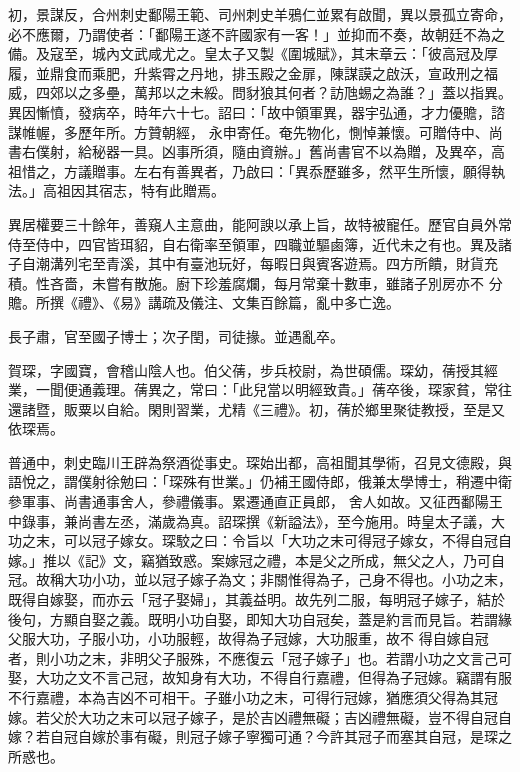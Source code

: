 \begin{pinyinscope}
 初，景謀反，合州刺史鄱陽王範、司州刺史羊鴉仁並累有啟聞，異以景孤立寄命，必不應爾，乃謂使者：「鄱陽王遂不許國家有一客！」並抑而不奏，故朝廷不為之備。及寇至，城內文武咸尤之。皇太子又製《圍城賦》，其末章云：「彼高冠及厚履，並鼎食而乘肥，升紫霄之丹地，排玉殿之金扉，陳謀謨之啟沃，宣政刑之福威，四郊以之多壘，萬邦以之未綏。問豺狼其何者？訪虺蜴之為誰？」蓋以指異。異因慚憤，發病卒，時年六十七。詔曰：「故中領軍異，器宇弘通，才力優贍，諮謀帷幄，多歷年所。方贊朝經，
 永申寄任。奄先物化，惻悼兼懷。可贈侍中、尚書右僕射，給秘器一具。凶事所須，隨由資辦。」舊尚書官不以為贈，及異卒，高祖惜之，方議贈事。左右有善異者，乃啟曰：「異忝歷雖多，然平生所懷，願得執法。」高祖因其宿志，特有此贈焉。



 異居權要三十餘年，善窺人主意曲，能阿諛以承上旨，故特被寵任。歷官自員外常侍至侍中，四官皆珥貂，自右衛率至領軍，四職並驅鹵簿，近代未之有也。異及諸子自潮溝列宅至青溪，其中有臺池玩好，每暇日與賓客遊焉。四方所饋，財貨充積。性吝嗇，未嘗有散施。廚下珍羞腐爛，每月常棄十數車，雖諸子別房亦不
 分贍。所撰《禮》、《易》講疏及儀注、文集百餘篇，亂中多亡逸。



 長子肅，官至國子博士；次子閏，司徒掾。並遇亂卒。



 賀琛，字國寶，會稽山陰人也。伯父蒨，步兵校尉，為世碩儒。琛幼，蒨授其經業，一聞便通義理。蒨異之，常曰：「此兒當以明經致貴。」蒨卒後，琛家貧，常往還諸暨，販粟以自給。閑則習業，尤精《三禮》。初，蒨於鄉里聚徒教授，至是又依琛焉。



 普通中，刺史臨川王辟為祭酒從事史。琛始出都，高祖聞其學術，召見文德殿，與語悅之，謂僕射徐勉曰：「琛殊有世業。」仍補王國侍郎，俄兼太學博士，稍遷中衛參軍事、尚書通事舍人，參禮儀事。累遷通直正員郎，
 舍人如故。又征西鄱陽王中錄事，兼尚書左丞，滿歲為真。詔琛撰《新謚法》，至今施用。時皇太子議，大功之末，可以冠子嫁女。琛駮之曰：令旨以「大功之末可得冠子嫁女，不得自冠自嫁。」推以《記》文，竊猶致惑。案嫁冠之禮，本是父之所成，無父之人，乃可自冠。故稱大功小功，並以冠子嫁子為文；非關惟得為子，己身不得也。小功之末，既得自嫁娶，而亦云「冠子娶婦」，其義益明。故先列二服，每明冠子嫁子，結於後句，方顯自娶之義。既明小功自娶，即知大功自冠矣，蓋是約言而見旨。若謂緣父服大功，子服小功，小功服輕，故得為子冠嫁，大功服重，故不
 得自嫁自冠者，則小功之末，非明父子服殊，不應復云「冠子嫁子」也。若謂小功之文言己可娶，大功之文不言己冠，故知身有大功，不得自行嘉禮，但得為子冠嫁。竊謂有服不行嘉禮，本為吉凶不可相干。子雖小功之末，可得行冠嫁，猶應須父得為其冠嫁。若父於大功之末可以冠子嫁子，是於吉凶禮無礙；吉凶禮無礙，豈不得自冠自嫁？若自冠自嫁於事有礙，則冠子嫁子寧獨可通？今許其冠子而塞其自冠，是琛之所惑也。




\end{pinyinscope}
